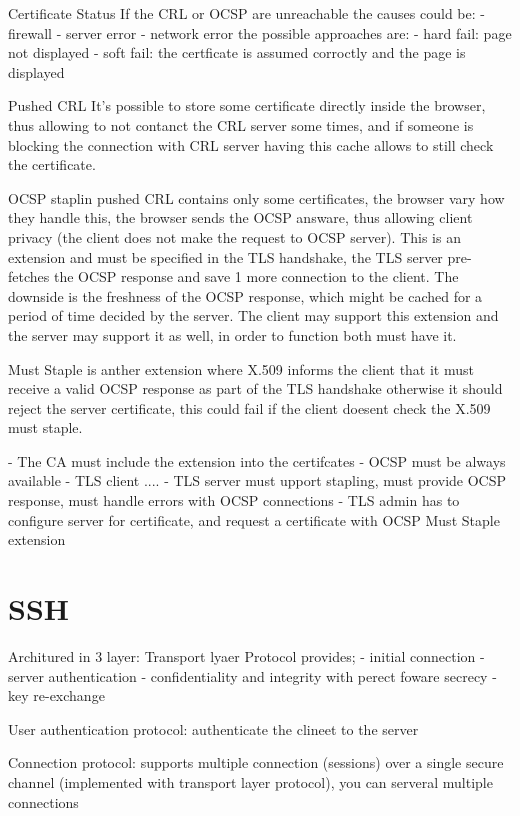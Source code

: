 \documentclass[12pt]{article}
\begin{document}
Certificate Status
If the CRL or OCSP are unreachable the causes could be:
- firewall
- server error
- network error
the possible approaches are:
- hard fail: page not displayed
- soft fail: the certficate is assumed corroctly and the page is displayed 

Pushed CRL 
It's possible to store some certificate directly inside the browser, thus allowing to not contanct the CRL server some times, and if someone is blocking the connection with CRL server having this cache allows to still check the certificate.

OCSP staplin
pushed CRL contains only some certificates, the browser vary how they handle this, the browser sends the OCSP answare, thus allowing client privacy (the client does not make the request to OCSP server). This is an extension and must be specified in the TLS handshake, the TLS server pre-fetches the OCSP response and save 1 more connection to the client. The downside is the freshness of the OCSP response, which might be cached for a period of time decided by the server. The client may support this extension and the server may support it as well, in order to function both must have it.

Must Staple
is anther extension where X.509 informs the client that it must receive a valid OCSP response as part of the TLS handshake otherwise it should reject the server certificate, this could fail if the client doesent check the X.509 must staple.

- The CA must include the extension into the certifcates
- OCSP must be always available
- TLS client ....
- TLS server must upport stapling, must provide OCSP response, must handle errors with OCSP connections
- TLS admin has to configure server for certificate, and request a certificate with OCSP Must Staple extension



\section{SSH}
Architured in 3 layer:
Transport lyaer Protocol provides;
- initial connection
- server authentication
- confidentiality and integrity with perect foware secrecy
- key re-exchange

User authentication protocol:
authenticate the clineet to the server

Connection protocol:
supports multiple connection (sessions) over a single secure channel (implemented with transport layer protocol), you can serveral multiple connections
\end{document}
